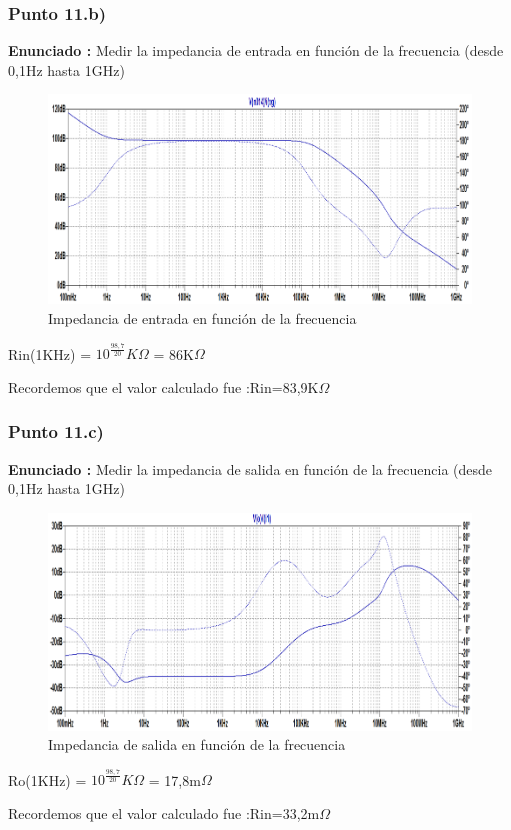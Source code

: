 \documentclass[12pt]{book}
\begin{document}
\subsubsection{Punto 11.b)}
\textbf{Enunciado : } Medir la impedancia de entrada en función de la frecuencia (desde 0,1Hz hasta 1GHz)\\[1cm]
\begin{figure}[H]
\centering
\includegraphics[scale=0.4]{figuras/11-b-Zin.png}
\caption{Impedancia de entrada en función de la frecuencia}
\label{figura11b}
\end{figure}
\begin{center}
Rin(1KHz) = $10^\frac{98,7}{20}K\Omega$ = 86K$\Omega$
\end{center}
Recordemos que el valor calculado fue :\quad Rin=83,9K$\Omega$

\subsubsection{Punto 11.c)}
\textbf{Enunciado : } Medir la impedancia de salida en función de la frecuencia (desde 0,1Hz hasta 1GHz)\\[1cm]
\begin{figure}[H]
\centering
\includegraphics[scale=0.4]{figuras/11-c-Zout.png}
\caption{Impedancia de salida en función de la frecuencia}
\label{figura11c}
\end{figure}
\begin{center}
Ro(1KHz) = $10^\frac{98,7}{20}K\Omega$ = 17,8m$\Omega$
\end{center}
Recordemos que el valor calculado fue :\quad Rin=33,2m$\Omega$
\end{document}
